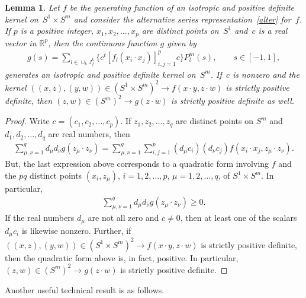 \documentclass[11pt]{article}
\numberwithin{equation}{section}
\newtheorem{Lemma}[Theorem]{Lemma}
\begin{document}
\begin{Lemma} \label{prelim} Let $f$ be the generating function of an isotropic and positive definite kernel on~\mbox{$S^1 \times S^m$} and consider the alternative series representation~\eqref{alter} for~$f$. If $p$ is a positive integer, $x_1, x_2, \ldots, x_p$ are distinct points on~$S^1$ and~$c$ is a real vector in $\mathbb{R}^p$, then the continuous function $g$ given by
\begin{gather*}g(s)=\sum_{l \in \cup_k J_f^k} \big\{c^t [f_l(x_i \cdot x_j) ]_{i,j=1}^p c\big\} P_l^m(s), \qquad s \in [-1,1],\end{gather*}
generates an isotropic and positive definite kernel on~$S^m$. If~$c$ is nonzero and the kernel $((x,z), (y,w)) \in (S^1 \times S^m)^2 \to f(x \cdot y, z \cdot w)$ is strictly positive definite, then $(z,w)\in (S^m)^2 \to g(z\cdot w)$ is strictly positive definite as well.
\end{Lemma}
\begin{proof} Write $c=(c_1,c_2, \ldots, c_p)$. If $z_1, z_2, \ldots, z_q$ are distinct points on $S^m$ and $d_1, d_2, \ldots, d_q$ are real numbers, then
\begin{gather*}\sum_{\mu,\nu=1}^q d_\mu d_\nu g(z_\mu \cdot z_\nu)=\sum_{\mu,\nu=1}^q \sum_{i,j=1}^p (d_\mu c_i) (d_\nu c_j) f(x_i \cdot x_j,z_\mu \cdot z_\nu).\end{gather*}
But, the last expression above corresponds to a quadratic form involving $f$ and the $pq$ distinct points $(x_i, z_\mu)$, $i=1,2,\ldots,p$, $\mu=1,2,\ldots,q$, of $S^1 \times S^m$. In particular,
\begin{gather*}\sum_{\mu,\nu=1}^q d_\mu d_\nu g(z_\mu \cdot z_\nu)\geq 0.\end{gather*}
If the real numbers $d_\mu$ are not all zero and $c\neq 0$, then at least one of the scalars $d_\mu c_i$ is likewise nonzero. Further, if $((x,z), (y,w)) \in (S^1 \times S^m)^2 \to f(x \cdot y, z \cdot w)$ is strictly positive def\/inite, then the quadratic form above is, in fact, positive. In particular, $(z,w) \in (S^m)^2 \to g(z\cdot w)$ is strictly positive def\/inite.
\end{proof}

Another useful technical result is as follows.
\end{document}
